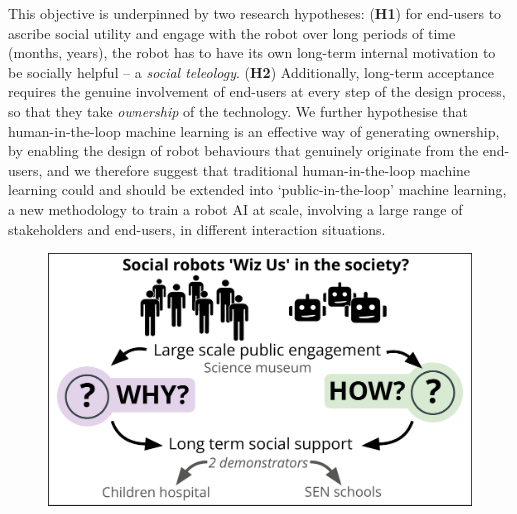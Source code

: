 \documentclass[11pt,a4paper]{report}
\begin{document}
This objective is underpinned by two research hypotheses: (\textbf{H1}) for
end-users to ascribe social utility and engage with the robot over long periods
of time (months, years), the robot has to have its own long-term internal
motivation to be socially helpful -- a \emph{social teleology}. (\textbf{H2})
Additionally, long-term acceptance requires the genuine involvement of end-users
at every step of the design process, so that they take \emph{ownership} of the
technology. We further hypothesise that human-in-the-loop machine learning is an
effective way of generating ownership, by enabling the design of robot
behaviours that genuinely originate from the end-users, and we therefore suggest
that traditional human-in-the-loop machine learning could and should be extended
into `public-in-the-loop' machine learning, a new methodology to train a robot
AI at scale, involving a large range of stakeholders and end-users, in different
interaction situations.





\begin{figure}
    \centering
    \includegraphics[width=0.9\linewidth]{concept}
    \label{fig|concept}
\end{figure}
\end{document}
